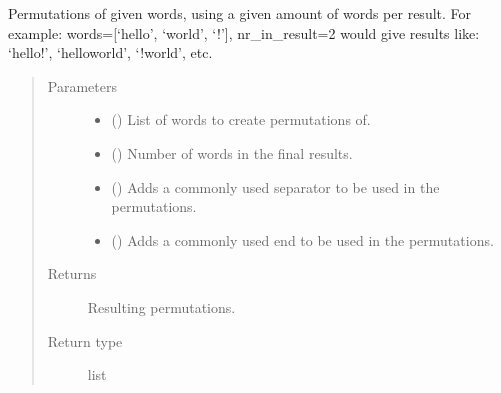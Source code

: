 \documentclass[letterpaper,10pt,english]{sphinxmanual}
\begin{document}
\begin{fulllineitems}
\begin{fulllineitems}
\label{\detokenize{EntroPass:EntroPass.pwd_gen.Pwd_gen.word_perms}}
\sphinxAtStartPar
Permutations of given words, using a given amount of  words per
result. For example: words={[}‘hello’, ‘world’, ‘!’{]}, nr\_in\_result=2
would give results like: ‘hello!’, ‘helloworld’, ‘!world’, etc.
\begin{quote}\begin{description}
\item[{Parameters}] \leavevmode\begin{itemize}
\item {} 
\sphinxAtStartPar
{} () \textendash{} List of words to create permutations of.

\item {} 
\sphinxAtStartPar
{} () \textendash{} Number of words in the final results.

\item {} 
\sphinxAtStartPar
{} (\sphinxstyleliteralemphasis{\sphinxupquote{, }}) \textendash{} Adds a commonly used separator to be used in the permutations.

\item {} 
\sphinxAtStartPar
{} (\sphinxstyleliteralemphasis{\sphinxupquote{, }}) \textendash{} Adds a commonly used end to be used in the permutations.

\end{itemize}

\item[{Returns}] \leavevmode
\sphinxAtStartPar
{} \textendash{} Resulting permutations.

\item[{Return type}] \leavevmode
\sphinxAtStartPar
list

\end{description}\end{quote}

\end{fulllineitems}


\end{fulllineitems}
\end{document}
